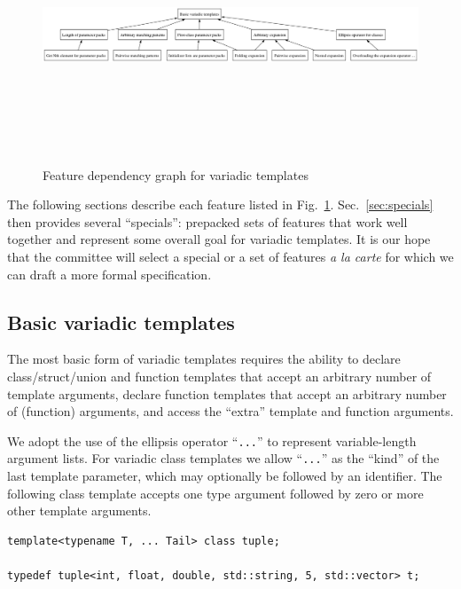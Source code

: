 \documentclass{article}
\begin{document}
\begin{figure}
\center
\includegraphics[width=6in,height=3in]{vt_deps}
\caption{Feature dependency graph for variadic templates}
\label{fig:dependencies}
\end{figure}

The following sections describe each feature listed in
Fig.~\ref{fig:dependencies}. Sec.~\ref{sec:specials} then provides several
``specials'': prepacked sets of features that work well together and
represent some overall goal for variadic templates. It is our hope
that the committee will select a special or a set of features
\textit{a la carte} for which we can draft a more formal
specification. 

\subsection{Basic variadic templates}
\label{sec:basic}
The most basic form of variadic templates requires the ability to
declare class/struct/union and function templates that accept an
arbitrary number of template arguments, declare function templates
that accept an arbitrary number of (function) arguments, and access
the ``extra'' template and function arguments.

We adopt the use of the ellipsis operator ``\texttt{...}'' to
represent variable-length argument lists. For variadic class templates
we allow ``\texttt{...}'' as the ``kind'' of the last template
parameter, which may optionally be followed by an identifier. The
following class template accepts one type argument followed by zero or
more other template arguments.

\begin{verbatim}
template<typename T, ... Tail> class tuple;

typedef tuple<int, float, double, std::string, 5, std::vector> t;
\end{verbatim}
\end{document}
